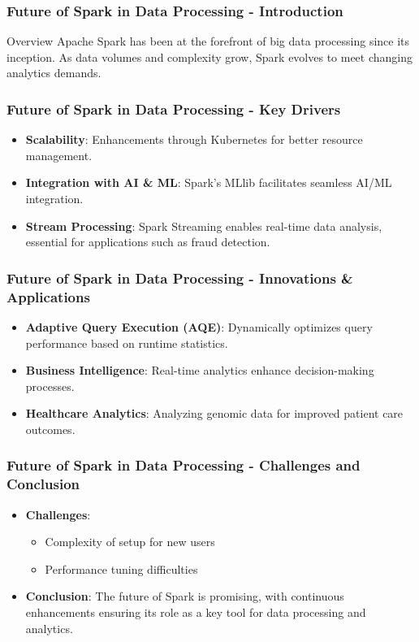 \documentclass[aspectratio=169]{beamer}
\begin{document}
\begin{frame}[fragile]
    \frametitle{Future of Spark in Data Processing - Introduction}
    \begin{block}{Overview}
        Apache Spark has been at the forefront of big data processing since its inception. As data volumes and complexity grow, Spark evolves to meet changing analytics demands.
    \end{block}
\end{frame}

\begin{frame}[fragile]
    \frametitle{Future of Spark in Data Processing - Key Drivers}
    \begin{itemize}
        \item \textbf{Scalability}: Enhancements through Kubernetes for better resource management.
        \item \textbf{Integration with AI \& ML}: Spark’s MLlib facilitates seamless AI/ML integration.
        \item \textbf{Stream Processing}: Spark Streaming enables real-time data analysis, essential for applications such as fraud detection.
    \end{itemize}
\end{frame}

\begin{frame}[fragile]
    \frametitle{Future of Spark in Data Processing - Innovations & Applications}
    \begin{itemize}
        \item \textbf{Adaptive Query Execution (AQE)}: Dynamically optimizes query performance based on runtime statistics.
        \item \textbf{Business Intelligence}: Real-time analytics enhance decision-making processes.
        \item \textbf{Healthcare Analytics}: Analyzing genomic data for improved patient care outcomes.
    \end{itemize}
\end{frame}

\begin{frame}[fragile]
    \frametitle{Future of Spark in Data Processing - Challenges and Conclusion}
    \begin{itemize}
        \item \textbf{Challenges}:
            \begin{itemize}
                \item Complexity of setup for new users
                \item Performance tuning difficulties
            \end{itemize}
        \item \textbf{Conclusion}: The future of Spark is promising, with continuous enhancements ensuring its role as a key tool for data processing and analytics.
    \end{itemize}
\end{frame}
\end{document}

